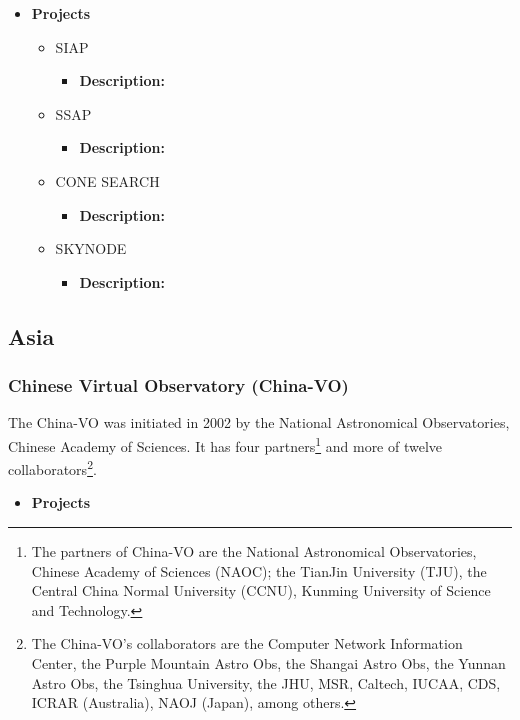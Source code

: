 \begin{itemize}
\item \textbf{Projects}
    \begin{itemize}
        \item SIAP
            \begin{itemize}
                \item \textbf{Description:} 
            \end{itemize}
        \item SSAP
            \begin{itemize}
                \item \textbf{Description:} 
            \end{itemize}
        \item CONE SEARCH
            \begin{itemize}
                \item \textbf{Description:} 
            \end{itemize}
        \item SKYNODE
            \begin{itemize}
                \item \textbf{Description:} 
            \end{itemize}
    \end{itemize}
\end{itemize}

\subsection{Asia}
\subsubsection{Chinese Virtual Observatory (China-VO)}
The China-VO was initiated in 2002 by the National Astronomical Observatories,
Chinese Academy of Sciences. It has four partners\footnote{The partners of
China-VO are the National Astronomical Observatories, Chinese Academy of
Sciences (NAOC); the TianJin University (TJU), the Central China Normal
University (CCNU), Kunming University of Science and Technology.} and more of
twelve collaborators\footnote{The China-VO's collaborators are the Computer
Network Information Center, the Purple Mountain Astro Obs, the Shangai Astro
Obs, the Yunnan Astro Obs, the Tsinghua University, the JHU, MSR, Caltech,
IUCAA, CDS, ICRAR (Australia), NAOJ (Japan), among others.}.

\begin{itemize}
	\item \textbf{Projects}
\end{itemize}

